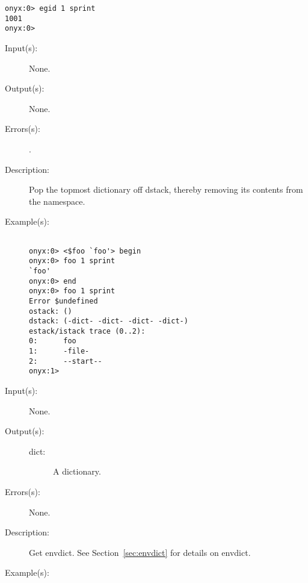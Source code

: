 \begin{description}
\begin{description}
\begin{verbatim}
onyx:0> egid 1 sprint
1001
onyx:0>
		\end{verbatim}
	\end{description}
\label{systemdict:end}
\item[{\onyxop{--}{end}{--}}: ]
	\begin{description}\item[]
	\item[Input(s): ] None.
	\item[Output(s): ] None.
	\item[Errors(s): ]
		\begin{description}\item[]
		\item[.]
		\end{description}
	\item[Description: ]
		Pop the topmost dictionary off dstack, thereby removing its
		contents from the namespace.
	\item[Example(s): ]\begin{verbatim}

onyx:0> <$foo `foo'> begin
onyx:0> foo 1 sprint
`foo'
onyx:0> end
onyx:0> foo 1 sprint
Error $undefined
ostack: ()
dstack: (-dict- -dict- -dict- -dict-)
estack/istack trace (0..2):
0:      foo
1:      -file-
2:      --start--
onyx:1>
		\end{verbatim}
	\end{description}
\label{systemdict:envdict}
\item[{\onyxop{--}{envdict}{dict}}: ]
	\begin{description}\item[]
	\item[Input(s): ] None.
	\item[Output(s): ]
		\begin{description}\item[]
		\item[dict: ]
			A dictionary.
		\end{description}
	\item[Errors(s): ] None.
	\item[Description: ]
		Get envdict.  See Section~\ref{sec:envdict} for details on
		envdict.
	\item[Example(s): ]\begin{verbatim}


\end{verbatim}
\end{description}
\end{description}
